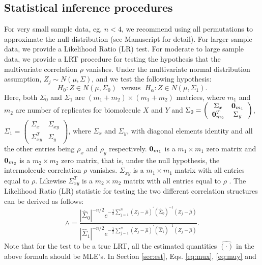 \documentclass[a4paper]{article}
\begin{document}
\subsection{Statistical inference procedures}
For very small sample data, eg, $n < 4$, we recommend using all permutations to
approximate the null distribution (see Manuscript for detail). For larger sample
data, we provide a Likelihood Ratio (LR) test. For moderate to large sample data, we provide a LRT procedure for
testing the hypothesis that the multivariate correlation $\rho$
vanishes. Under the multivariate normal distribution assumption, $Z_j \sim N(\mu, \Sigma)$, and we
test the following hypothesis:
\begin{equation}
H_0:Z \in N(\mu, \Sigma_0) \; \mbox{ versus } \; H_{\alpha}:Z \in
N(\mu, \Sigma_1).
\end{equation}
Here, both $\Sigma_0$ and $\Sigma_1$ are $(m_1 + m_2) \times
(m_1+m_2)$ matrices, where $m_1$ and $m_2$ are number of replicates
for biomolecule $X$ and $Y$ and
$\Sigma_0= \left( \begin{array} {cc} \Sigma_x & {\bf 0}_{m_1} \\
{\bf 0}_{m_2}^{T} & \Sigma_y \end{array} \right)$, $\Sigma_1= \left( \begin{array} {cc} \Sigma_x & \Sigma_{xy} \\
\Sigma_{xy}^{T} & \Sigma_y \end{array} \right)$, where $\Sigma_x$
and $\Sigma_y$, with diagonal elements identity and all the other
entries being $\rho_x$ and $\rho_y$ respectively. ${\bf 0}_{m_1}$ is
a $m_1 \times m_1$ zero matrix and ${\bf 0}_{m_2}$ is a $m_2 \times
m_2$ zero matrix, that is, under the null hypothesis, the
intermolecule correlation $\rho$ vanishes. $\Sigma_{xy}$ is a $m_1
\times m_1$ matrix with all entries equal to $\rho$. Likewise
$\Sigma_{xy}^T$ is a $m_2 \times m_2$ matrix with all entries equal
to $\rho$ . The Likelihood Ratio (LR) statistic for testing the two
different correlation structures can be derived as follows:
\begin{equation}
\wedge = \frac{|\hat{\Sigma}_0|^{-n/2}e^{-\frac{1}{2}
\sum_{j=1}^{n}(Z_j-\hat{\mu})^{'}(\hat{\Sigma}_0)^{-1}(Z_j-\hat{\mu})}}
{|\hat{\Sigma}_1|^{-n/2} e^{-\frac{1}{2}
\sum_{j=1}^{n}(Z_j-\hat{\mu})^{'}(\hat{\Sigma}_1)^{-1}(Z_j-\hat{\mu})}
}.
\end{equation}
Note that for the test to be a true LRT, all the estimated
quantities $\hat{(\cdot)}$ in the above formula should be MLE's. In
Section \ref{sec:est}, Eqs. \ref{eq:mux}, \ref{eq:muy} and
\end{document}
